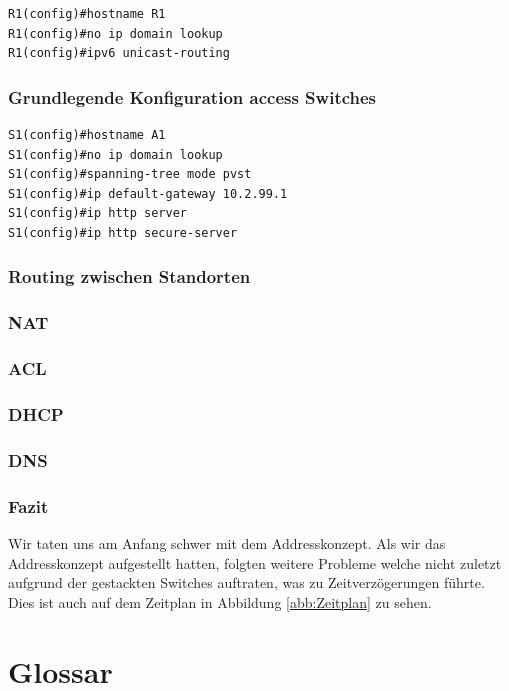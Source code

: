 \documentclass[12pt,a4paper,titlepage]{article}
\begin{document}
 \begin{lstlisting}[frame=single, captionpos=b,caption= Router Grund Konfig]
R1(config)#hostname R1
R1(config)#no ip domain lookup
R1(config)#ipv6 unicast-routing
\end{lstlisting}

\subsubsection{Grundlegende Konfiguration access Switches}
 \begin{lstlisting}[frame=single, captionpos=b,caption= Switch Grund Konfig]
S1(config)#hostname A1
S1(config)#no ip domain lookup
S1(config)#spanning-tree mode pvst
S1(config)#ip default-gateway 10.2.99.1
S1(config)#ip http server
S1(config)#ip http secure-server
\end{lstlisting}

\subsubsection{Routing zwischen Standorten}

\subsubsection{NAT}


\subsubsection{ACL}
\subsubsection{DHCP}
\subsubsection{DNS}
\newpage
\subsubsection{Fazit}
Wir taten uns am Anfang schwer mit dem Addresskonzept. Als wir das Addresskonzept aufgestellt hatten, folgten weitere Probleme welche nicht zuletzt aufgrund der gestackten Switches auftraten, was zu Zeitverzögerungen führte. Dies ist auch auf dem Zeitplan in Abbildung \ref{abb:Zeitplan} zu sehen.

\newpage

\section {Glossar}
\begin{acronym}[Bash]
\acro{}{}
\end{acronym}
\newpage
\end{document}
